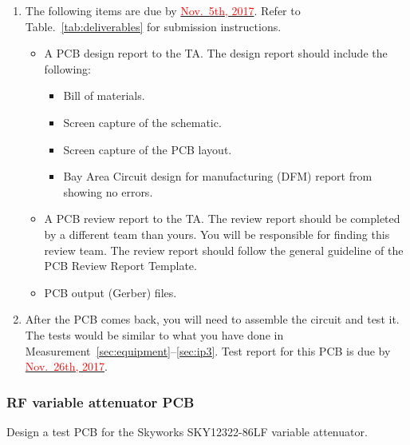 \documentclass[letterpaper, 11pt]{article}
\newcommand{\due}[1]{\href{https://github.com/ucdart/UCD-EEC134/blob/master/support/schedule/eec134-schedule.pdf}{\textcolor{red}{#1}}}
\begin{document}
\begin{enumerate}
	\item The following items are due by \due{Nov.~5th, 2017}. Refer to Table.~\ref{tab:deliverables} for submission instructions. 
		\begin{itemize}
			\item A PCB design report to the TA. The design report should include the following:
				\begin{itemize}
					\item Bill of materials.
					\item Screen capture of the schematic.
					\item Screen capture of the PCB layout.
					\item Bay Area Circuit design for manufacturing (DFM) report from showing no errors.
				\end{itemize}
			\item A PCB review report to the TA. The review report should be completed by a different team than yours. You will be responsible for finding this review team. The review report should follow the general guideline of the PCB Review Report Template.
			
			\item PCB output (Gerber) files.
		\end{itemize}

	\item After the PCB comes back, you will need to assemble the circuit and test it. The tests would be similar to what you have done in Measurement~\ref{sec:equipment}--\ref{sec:ip3}. Test report for this PCB is due by \due{Nov.~26th, 2017}.

\end{enumerate}
	
\subsubsection{RF variable attenuator PCB}
Design a test PCB for the Skyworks SKY12322-86LF variable attenuator. 
\end{document}
